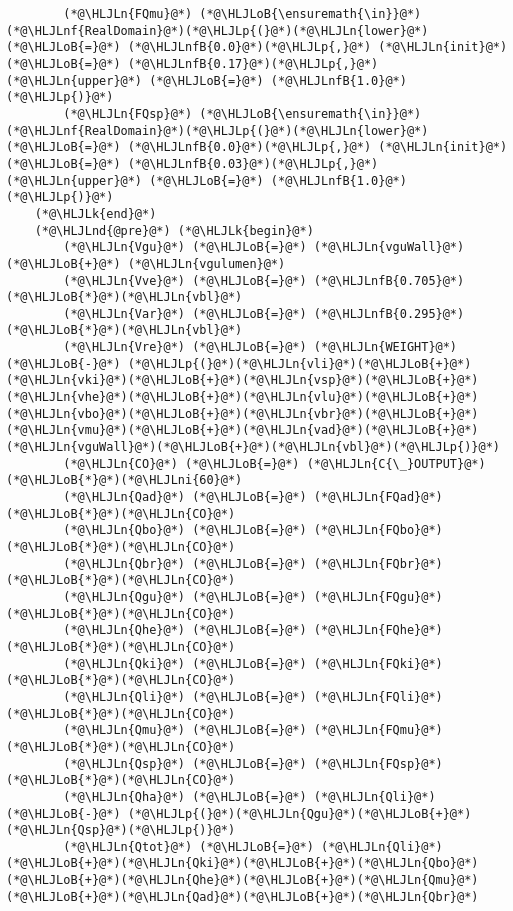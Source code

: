 \documentclass[12pt,a4paper]{article}
\newcommand{\HLJLk}[1]{\textcolor[RGB]{148,91,176}{\textbf{#1}}}
\newcommand{\HLJLn}[1]{#1}
\newcommand{\HLJLnd}[1]{\textcolor[RGB]{214,102,97}{#1}}
\newcommand{\HLJLnf}[1]{\textcolor[RGB]{66,102,213}{#1}}
\newcommand{\HLJLnfB}[1]{\textcolor[RGB]{59,151,46}{#1}}
\newcommand{\HLJLni}[1]{\textcolor[RGB]{59,151,46}{#1}}
\newcommand{\HLJLoB}[1]{\textcolor[RGB]{102,102,102}{\textbf{#1}}}
\newcommand{\HLJLp}[1]{#1}
\begin{document}
\begin{lstlisting}
        (*@\HLJLn{FQmu}@*) (*@\HLJLoB{\ensuremath{\in}}@*) (*@\HLJLnf{RealDomain}@*)(*@\HLJLp{(}@*)(*@\HLJLn{lower}@*) (*@\HLJLoB{=}@*) (*@\HLJLnfB{0.0}@*)(*@\HLJLp{,}@*) (*@\HLJLn{init}@*) (*@\HLJLoB{=}@*) (*@\HLJLnfB{0.17}@*)(*@\HLJLp{,}@*) (*@\HLJLn{upper}@*) (*@\HLJLoB{=}@*) (*@\HLJLnfB{1.0}@*)(*@\HLJLp{)}@*)
        (*@\HLJLn{FQsp}@*) (*@\HLJLoB{\ensuremath{\in}}@*) (*@\HLJLnf{RealDomain}@*)(*@\HLJLp{(}@*)(*@\HLJLn{lower}@*) (*@\HLJLoB{=}@*) (*@\HLJLnfB{0.0}@*)(*@\HLJLp{,}@*) (*@\HLJLn{init}@*) (*@\HLJLoB{=}@*) (*@\HLJLnfB{0.03}@*)(*@\HLJLp{,}@*) (*@\HLJLn{upper}@*) (*@\HLJLoB{=}@*) (*@\HLJLnfB{1.0}@*)(*@\HLJLp{)}@*)
    (*@\HLJLk{end}@*)
    (*@\HLJLnd{@pre}@*) (*@\HLJLk{begin}@*)
        (*@\HLJLn{Vgu}@*) (*@\HLJLoB{=}@*) (*@\HLJLn{vguWall}@*) (*@\HLJLoB{+}@*) (*@\HLJLn{vgulumen}@*)
        (*@\HLJLn{Vve}@*) (*@\HLJLoB{=}@*) (*@\HLJLnfB{0.705}@*)(*@\HLJLoB{*}@*)(*@\HLJLn{vbl}@*)
        (*@\HLJLn{Var}@*) (*@\HLJLoB{=}@*) (*@\HLJLnfB{0.295}@*)(*@\HLJLoB{*}@*)(*@\HLJLn{vbl}@*)
        (*@\HLJLn{Vre}@*) (*@\HLJLoB{=}@*) (*@\HLJLn{WEIGHT}@*) (*@\HLJLoB{-}@*) (*@\HLJLp{(}@*)(*@\HLJLn{vli}@*)(*@\HLJLoB{+}@*)(*@\HLJLn{vki}@*)(*@\HLJLoB{+}@*)(*@\HLJLn{vsp}@*)(*@\HLJLoB{+}@*)(*@\HLJLn{vhe}@*)(*@\HLJLoB{+}@*)(*@\HLJLn{vlu}@*)(*@\HLJLoB{+}@*)(*@\HLJLn{vbo}@*)(*@\HLJLoB{+}@*)(*@\HLJLn{vbr}@*)(*@\HLJLoB{+}@*)(*@\HLJLn{vmu}@*)(*@\HLJLoB{+}@*)(*@\HLJLn{vad}@*)(*@\HLJLoB{+}@*)(*@\HLJLn{vguWall}@*)(*@\HLJLoB{+}@*)(*@\HLJLn{vbl}@*)(*@\HLJLp{)}@*)
        (*@\HLJLn{CO}@*) (*@\HLJLoB{=}@*) (*@\HLJLn{C{\_}OUTPUT}@*)(*@\HLJLoB{*}@*)(*@\HLJLni{60}@*)
        (*@\HLJLn{Qad}@*) (*@\HLJLoB{=}@*) (*@\HLJLn{FQad}@*)(*@\HLJLoB{*}@*)(*@\HLJLn{CO}@*)
        (*@\HLJLn{Qbo}@*) (*@\HLJLoB{=}@*) (*@\HLJLn{FQbo}@*)(*@\HLJLoB{*}@*)(*@\HLJLn{CO}@*)
        (*@\HLJLn{Qbr}@*) (*@\HLJLoB{=}@*) (*@\HLJLn{FQbr}@*)(*@\HLJLoB{*}@*)(*@\HLJLn{CO}@*)
        (*@\HLJLn{Qgu}@*) (*@\HLJLoB{=}@*) (*@\HLJLn{FQgu}@*)(*@\HLJLoB{*}@*)(*@\HLJLn{CO}@*)
        (*@\HLJLn{Qhe}@*) (*@\HLJLoB{=}@*) (*@\HLJLn{FQhe}@*)(*@\HLJLoB{*}@*)(*@\HLJLn{CO}@*)
        (*@\HLJLn{Qki}@*) (*@\HLJLoB{=}@*) (*@\HLJLn{FQki}@*)(*@\HLJLoB{*}@*)(*@\HLJLn{CO}@*)
        (*@\HLJLn{Qli}@*) (*@\HLJLoB{=}@*) (*@\HLJLn{FQli}@*)(*@\HLJLoB{*}@*)(*@\HLJLn{CO}@*)
        (*@\HLJLn{Qmu}@*) (*@\HLJLoB{=}@*) (*@\HLJLn{FQmu}@*)(*@\HLJLoB{*}@*)(*@\HLJLn{CO}@*)
        (*@\HLJLn{Qsp}@*) (*@\HLJLoB{=}@*) (*@\HLJLn{FQsp}@*)(*@\HLJLoB{*}@*)(*@\HLJLn{CO}@*)
        (*@\HLJLn{Qha}@*) (*@\HLJLoB{=}@*) (*@\HLJLn{Qli}@*) (*@\HLJLoB{-}@*) (*@\HLJLp{(}@*)(*@\HLJLn{Qgu}@*)(*@\HLJLoB{+}@*)(*@\HLJLn{Qsp}@*)(*@\HLJLp{)}@*)
        (*@\HLJLn{Qtot}@*) (*@\HLJLoB{=}@*) (*@\HLJLn{Qli}@*)(*@\HLJLoB{+}@*)(*@\HLJLn{Qki}@*)(*@\HLJLoB{+}@*)(*@\HLJLn{Qbo}@*)(*@\HLJLoB{+}@*)(*@\HLJLn{Qhe}@*)(*@\HLJLoB{+}@*)(*@\HLJLn{Qmu}@*)(*@\HLJLoB{+}@*)(*@\HLJLn{Qad}@*)(*@\HLJLoB{+}@*)(*@\HLJLn{Qbr}@*)

\end{lstlisting}
\end{document}
